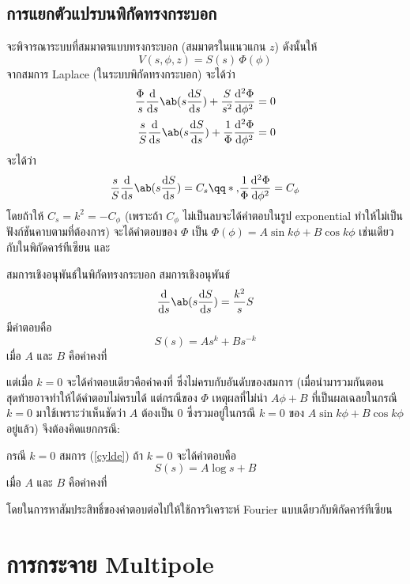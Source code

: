 \subsection{การแยกตัวแปรบนพิกัดทรงกระบอก}
จะพิจารณาระบบที่สมมาตรแบบทรงกระบอก (สมมาตรในแนวแกน $z$) ดังนั้นให้
\[
V(s,\phi,z)=S(s)\,\Phi(\phi)
\]
จากสมการ Laplace (ในระบบพิกัดทรงกระบอก) จะได้ว่า
\begin{align*}
    \frac{\Phi}{s}\odv{}{s}\ab(s\odv{S}{s})+\frac{S}{s^2}\odv[2]{\Phi}{\phi}&=0\\
    \frac{s}{S}\odv{}{s}\ab(s\odv{S}{s})+\frac{1}{\Phi}\odv[2]{\Phi}{\phi}&=0
\end{align*}
จะได้ว่า
\[
\frac{s}{S}\odv{}{s}\ab(s\odv{S}{s})=C_s\qq*{,}\frac{1}{\Phi}\odv[2]{\Phi}{\phi}=C_\phi
\]
โดยถ้าให้ $C_s=k^2=-C_\phi$ (เพราะถ้า $C_\phi$ ไม่เป็นลบจะได้คำตอบในรูป exponential ทำให้ไม่เป็นฟังก์ชันคาบตามที่ต้องการ) จะได้คำตอบของ $\Phi$ เป็น $\Phi(\phi)=A\sin k\phi+B\cos k\phi$ เช่นเดียวกับในพิกัดคาร์ทีเซียน และ
\begin{lawbox}{สมการเชิงอนุพันธ์ในพิกัดทรงกระบอก}
    สมการเชิงอนุพันธ์
    \begin{equation}
    \odv{}{s}\ab(s\odv{S}{s})=\frac{k^2}{s}S\label{cylde}
    \end{equation}
    มีคำตอบคือ
    \begin{equation}
        S(s)=As^k+Bs^{-k}
    \end{equation}
    เมื่อ $A$ และ $B$ คือค่าคงที่
\end{lawbox}
แต่เมื่อ $k=0$ จะได้คำตอบเดียวคือค่าคงที่ ซึ่งไม่ครบกับอันดับของสมการ (เมื่อนำมารวมกันตอนสุดท้ายอาจทำให้ได้คำตอบไม่ครบได้ แต่กรณีของ $\Phi$ เหตุผลที่ไม่นำ $A\phi+B$ ที่เป็นผลเฉลยในกรณี $k=0$ มาใช้เพราะว่าเห็นชัดว่า $A$ ต้องเป็น $0$ ซึ่งรวมอยู่ในกรณี $k=0$ ของ $A\sin k\phi + B\cos k\phi$ อยู่แล้ว) จึงต้องคิดแยกกรณี:
\begin{lawbox}{กรณี $k=0$}
    สมการ (\ref{cylde}) ถ้า $k=0$ จะได้คำตอบคือ
    \begin{equation}
        S(s)=A\log s+B
    \end{equation}
    เมื่อ $A$ และ $B$ คือค่าคงที่
\end{lawbox}
โดยในการหาสัมประสิทธิ์ของคำตอบต่อไปให้ใช้การวิเคราะห์ Fourier แบบเดียวกับพิกัดคาร์ทีเซียน

\section{การกระจาย Multipole}
